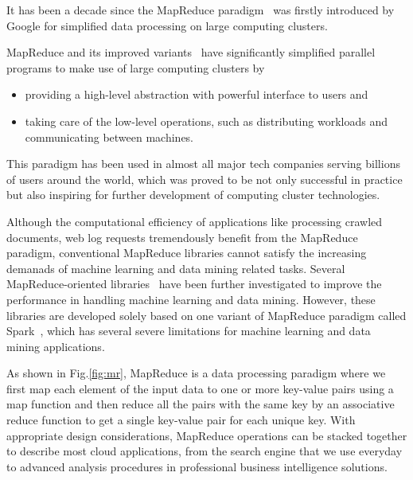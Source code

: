 
It has been a decade since the MapReduce paradigm~\cite{dean2008mapreduce, dean2010mapreduce,dean2006experiences} was firstly introduced by Google for simplified data processing on large computing clusters.


MapReduce and its improved variants~\cite{dean2008mapreduce, chambers2010flumejava, dean2010mapreduce, zaharia2010spark, zaharia2016apache,condie2010mapreduce,zaharia2008improving,goiri2015approxhadoop,afrati2010optimizing,li2015coded,ekanayake2010twister,he2008mars,bhatotia2011incoop} have significantly simplified parallel programs to make use of large computing clusters by
\begin{itemize}
    \item providing a high-level abstraction with powerful interface to users and
    \item taking care of the low-level operations, such as distributing workloads and communicating between machines.
\end{itemize}


This paradigm has been used in almost all major tech companies serving billions of users around the world, which was proved to be not only successful in practice but also inspiring for further development of computing cluster technologies. 

Although the computational efficiency of applications like processing crawled documents, web log requests tremendously benefit from the MapReduce paradigm, conventional MapReduce libraries cannot satisfy the increasing demanads of machine learning and data mining related tasks.
Several MapReduce-oriented libraries~\cite{bosagh2016matrix, meng2016mllib, shanahan2015large} have been further investigated to improve the performance in handling machine learning and data mining.
However, these libraries are developed solely based on one variant of MapReduce paradigm called Spark~\cite{zaharia2010spark, zaharia2016apache}, which has several severe limitations for machine learning and data mining applications. 

As shown in Fig.\ref{fig:mr}, MapReduce is a data processing paradigm where we first map each element of the input data to one or more key-value pairs using a map function and then reduce all the pairs with the same key by an associative reduce function to get a single key-value pair for each unique key. With appropriate design considerations, MapReduce operations can be stacked together to describe most cloud applications, from the search engine that we use everyday to advanced analysis procedures in professional business intelligence solutions. 


